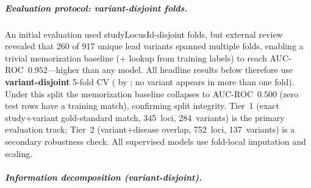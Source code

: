 \documentclass[11pt,openany]{report}
\begin{document}
\subparagraph{Evaluation protocol: variant-disjoint folds.}
An initial evaluation used studyLocusId-disjoint folds, but
external review revealed that 260 of 917 unique lead variants
spanned multiple folds, enabling a trivial memorization baseline
(+ lookup from training labels) to
reach AUC-ROC~$0.952$---higher than any model.
All headline results below therefore use \textbf{variant-disjoint}
5-fold CV ( by ; no variant appears
in more than one fold).  Under this split the memorization baseline
collapses to AUC-ROC~$0.500$ (zero test rows have a training match),
confirming split integrity.
Tier~1 (exact study+variant gold-standard match, 345~loci,
284~variants) is the primary evaluation track; Tier~2
(variant+disease overlap, 752~loci, 137~variants) is a secondary
robustness check.
All supervised models use fold-local imputation and scaling.

\subparagraph{Information decomposition (variant-disjoint).}
\label{tab:gwas-vd-results}
\end{document}
